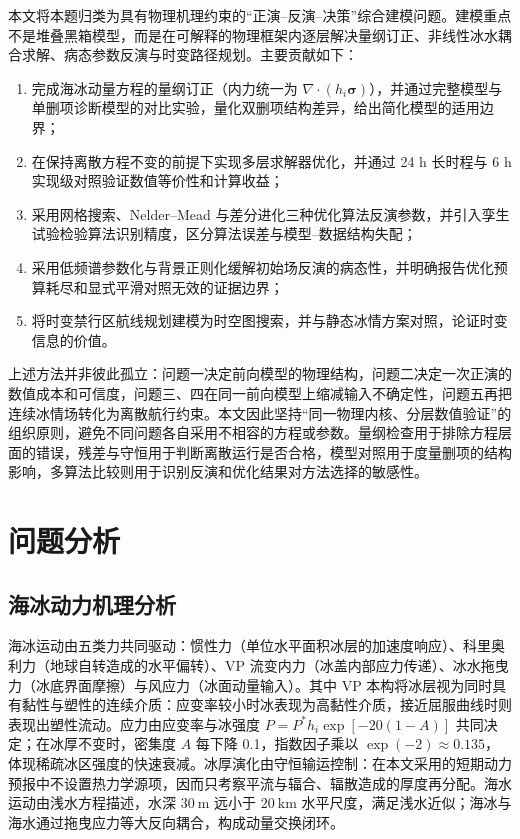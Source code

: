 \documentclass[UTF8]{ctexart}
\newcommand{\vect}[1]{\boldsymbol{#1}}
\begin{document}
本文将本题归类为具有物理机理约束的“正演--反演--决策”综合建模问题。建模重点不是堆叠黑箱模型，而是在可解释的物理框架内逐层解决量纲订正、非线性冰水耦合求解、病态参数反演与时变路径规划。主要贡献如下：

\begin{enumerate}
\item 完成海冰动量方程的量纲订正（内力统一为 $\nabla\cdot(h_i\vect\sigma)$），并通过完整模型与单删项诊断模型的对比实验，量化双删项结构差异，给出简化模型的适用边界；
\item 在保持离散方程不变的前提下实现多层求解器优化，并通过 24 h 长时程与 6 h 实现级对照验证数值等价性和计算收益；
\item 采用网格搜索、Nelder--Mead 与差分进化三种优化算法反演参数，并引入孪生试验检验算法识别精度，区分算法误差与模型--数据结构失配；
\item 采用低频谱参数化与背景正则化缓解初始场反演的病态性，并明确报告优化预算耗尽和显式平滑对照无效的证据边界；
\item 将时变禁行区航线规划建模为时空图搜索，并与静态冰情方案对照，论证时变信息的价值。
\end{enumerate}

上述方法并非彼此孤立：问题一决定前向模型的物理结构，问题二决定一次正演的数值成本和可信度，问题三、四在同一前向模型上缩减输入不确定性，问题五再把连续冰情场转化为离散航行约束。本文因此坚持“同一物理内核、分层数值验证”的组织原则，避免不同问题各自采用不相容的方程或参数。量纲检查用于排除方程层面的错误，残差与守恒用于判断离散运行是否合格，模型对照用于度量删项的结构影响，多算法比较则用于识别反演和优化结果对方法选择的敏感性。

\section{问题分析}

\subsection{海冰动力机理分析}

海冰运动由五类力共同驱动：惯性力（单位水平面积冰层的加速度响应）、科里奥利力（地球自转造成的水平偏转）、VP 流变内力（冰盖内部应力传递）、冰水拖曳力（冰底界面摩擦）与风应力（冰面动量输入）。其中 VP 本构将冰层视为同时具有黏性与塑性的连续介质\cite{hibler1979,feltham2008}：应变率较小时冰表现为高黏性介质，接近屈服曲线时则表现出塑性流动。应力由应变率与冰强度 $P=P^*h_i\exp[-20(1-A)]$ 共同决定；在冰厚不变时，密集度 $A$ 每下降 0.1，指数因子乘以 $\exp(-2)\approx0.135$，体现稀疏冰区强度的快速衰减。冰厚演化由守恒输运控制：在本文采用的短期动力预报中不设置热力学源项，因而只考察平流与辐合、辐散造成的厚度再分配。海水运动由浅水方程描述，水深 $30\ \mathrm m$ 远小于 $20\ \mathrm{km}$ 水平尺度，满足浅水近似；海冰与海水通过拖曳应力等大反向耦合，构成动量交换闭环。
\end{document}
